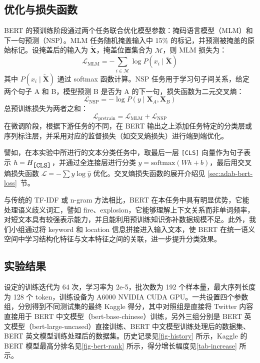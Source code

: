 \documentclass[12pt, a4paper, UTF8]{ctexart}
\begin{document}
\subsection{优化与损失函数}
BERT 的预训练阶段通过两个任务联合优化模型参数：掩码语言模型（MLM）和下一句预测（NSP）。MLM 任务随机掩盖输入中 15\% 的标记，并预测被掩盖的原始标记。设掩盖后的输入为 $\tilde{\mathbf{X}}$，掩盖位置集合为 $\mathcal{M}$，则 MLM 损失为：
\[
\mathcal{L}_{\text{MLM}} = -\sum_{i \in \mathcal{M}} \log P(x_i \mid \tilde{\mathbf{X}})
\]
其中 $P(x_i \mid \tilde{\mathbf{X}})$ 通过 softmax 函数计算。NSP 任务用于学习句子间关系，给定两个句子 A 和 B，模型预测 B 是否为 A 的下一句，损失函数为二元交叉熵：
\[
\mathcal{L}_{\text{NSP}} = -\log P(y \mid \mathbf{X}_{A}, \mathbf{X}_{B})
\]
总预训练损失为两者之和：
\[
\mathcal{L}_{\text{pretrain}} = \mathcal{L}_{\text{MLM}} + \mathcal{L}_{\text{NSP}}
\]
在微调阶段，根据下游任务的不同，在 BERT 输出之上添加任务特定的分类层或序列标注层，并采用对应的监督损失（如交叉熵损失）进行端到端优化。

譬如，在本实验中所进行的文本分类任务中，取最后一层 \verb|[CLS]| 向量作为句子表示 $h = H_{\verb|[CLS]|}$，并通过全连接层进行分类 $y = \text{softmax}(Wh + b)$，最后用交叉熵损失函数 $\mathcal{L} = - \displaystyle\sum y \log \hat{y}$ 优化。交叉熵损失函数的展开介绍见 \ref{sec:adab-bert-loss}~节。

与传统的 TF-IDF 或 n-gram 方法相比，BERT 在本任务中具有明显优势，它能处理语义歧义词汇，譬如 fire、explosion，它能够理解上下文关系而非单词频率，对短文本具有较强表示能力，并且能利用预训练知识弥补数据规模不足。此外，我们小组通过将 keyword 和 location 信息拼接进入输入文本，使 BERT 在统一语义空间中学习结构化特征与文本特征之间的关联，进一步提升分类效果。



\subsection{实验结果}
设定的训练迭代为 64 次，学习率为 2e-5，批次数为 192 个样本量，最大序列长度为 128 个 token，训练设备为 A6000 NVIDIA CUDA GPU。一共设置四个参数组，分别得到不同测试集的最终 Kaggle 得分，其中对照组是直接将 Twitter 内容直接用于 BERT 中文模型（bert-base-chinese）训练，另外三组分别是 BERT 英文模型（bert-large-uncased）直接训练、BERT 中文模型训练处理后的数据集、BERT 英文模型训练处理后的数据集。历史记录见\autoref{fig-history} 所示，Kaggle 的 BERT 模型最高分排名见\autoref{fig-bert-rank} 所示，得分增长幅度见\autoref{tab-increase} 所示。
\end{document}
